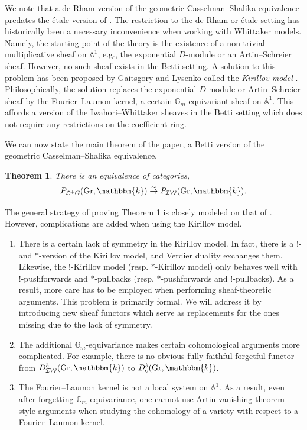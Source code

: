 \documentclass{amsart}
\renewcommand{\L}{\mathcal{L}}
\newcommand{\A}{\mathbb{A}}
\newcommand{\G}{\mathbb{G}}
\renewcommand{\k}{\mathbbm{k}}
\newcommand{\IW}{\mathcal{IW}}
\DeclareMathOperator{\cons}{c}
\DeclareMathOperator{\Gr}{Gr}
\newtheorem{theorem}[subsubsection]{Theorem}
\theoremstyle{definition}
\begin{document}
    We note that a de Rham version of the geometric Casselman--Shalika equivalence \cite{ABBGM} predates the étale version of \cite{BGMRR}.
    The restriction to the de Rham or étale setting has historically been a necessary inconvenience when working with Whittaker models.
    Namely, the starting point of the theory is the existence of a non-trivial multiplicative sheaf on $\A^1$, e.g., the exponential $D$-module or an Artin--Schreier sheaf.
    However, no such sheaf exists in the Betti setting. A solution to this problem has been proposed by Gaitsgory and Lysenko called the \emph{Kirillov model} \cite{GaiWhit, GL}.
    Philosophically, the solution replaces the exponential $D$-module or Artin--Schreier sheaf by the Fourier--Laumon kernel, a certain $\G_m$-equivariant sheaf on $\A^1$.
    This affords a version of the Iwahori--Whittaker sheaves in the Betti setting which does not require any restrictions on the coefficient ring.
    
    We can now state the main theorem of the paper, a Betti version of the geometric Casselman--Shalika equivalence.
    \begin{theorem}\label{thm:1}
        There is an equivalence of categories,
        \[P_{\L^+ G} (\Gr, \k) \stackrel{\sim}{\to} P_{\IW} (\Gr, \k).\]
    \end{theorem}

    The general strategy of proving Theorem \ref{thm:1} is closely modeled on that of \cite{ABBGM}.
    However, complications are added when using the Kirillov model.
    \begin{enumerate}
        \item There is a certain lack of symmetry in the Kirillov model. In fact, there is a $!$- and $*$-version of the Kirillov model, and Verdier duality exchanges them.
        Likewise, the $!$-Kirillov model (resp. $*$-Kirillov model) only behaves well with $!$-pushforwards and $*$-pullbacks (resp. $*$-pushforwards and $!$-pullbacks).
        As a result, more care has to be employed when performing sheaf-theoretic arguments. This problem is primarily formal. We will address it by introducing new sheaf functors which serve as replacements for the ones missing due to the lack of symmetry.
        \item The additional $\G_m$-equivariance makes certain cohomological arguments more complicated. For example, there is no obvious fully faithful forgetful functor from $D_{\IW}^b (\Gr, \k)$ to $D_{\cons}^b (\Gr, \k)$.
        \item The Fourier--Laumon kernel is not a local system on $\A^1$. As a result, even after forgetting $\G_m$-equivariance, one cannot use Artin vanishing theorem style arguments when studying the cohomology of a variety with respect to a Fourier--Laumon kernel. 
    \end{enumerate}
\end{document}

